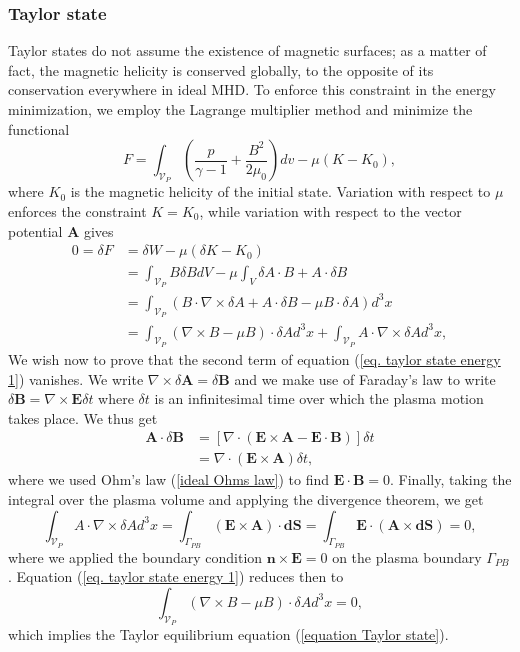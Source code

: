 \documentclass[my_thesis.tex]{subfiles}
\begin{document}
\subsubsection{Taylor state}
Taylor states do not assume the existence of magnetic surfaces; as a matter of fact, the magnetic helicity is conserved globally, to the opposite of its conservation everywhere in ideal MHD. To enforce this constraint in the energy minimization, we employ the Lagrange multiplier method and minimize the functional
\begin{equation}
	F = \int_{\mathcal{V}_P} \left(\frac{p}{\gamma-1}+\frac{B^2}{2\mu_0}\right)dv - \mu(K-K_0),
\end{equation}
where $K_0$ is the magnetic helicity of the initial state. Variation with respect to $\mu$ enforces the constraint $K=K_0$, while variation with respect to the vector potential $\mathbf{A}$ gives
\begin{align}
	0 = \delta F &= \delta W - \mu(\delta K - K_0)\\
	&= \int_{\mathcal{V}_P} B\delta B dV - \mu \int_V \delta A \cdot B + A \cdot \delta B\\
	&=\int_{\mathcal{V}_P} \left(B \cdot \nabla \times \delta A + A\cdot \delta B - \mu B \cdot \delta A\right) d^3x\\
	&=\int_{\mathcal{V}_P} \left( \nabla \times B - \mu B \right) \cdot \delta Ad^3x + \int_{\mathcal{V}_P}A \cdot \nabla \times \delta A d^3x, \label{eq. taylor state energy 1}
\end{align}
We wish now to prove that the second term of equation (\ref{eq. taylor state energy 1}) vanishes. We write $\nabla\times\delta\mathbf{A}=\delta\mathbf{B}$ and we make use of Faraday's law to write $\delta\mathbf{B} = \nabla\times\mathbf{E}\delta t$ where $\delta t$ is an infinitesimal time over which the plasma motion takes place. We thus get
\begin{align}
	\mathbf{A}\cdot\delta\mathbf{B}&=\left[\nabla\cdot(\mathbf{E}\times\mathbf{A}-\mathbf{E}\cdot\mathbf{B})\right]\delta t\\
	&= \nabla\cdot(\mathbf{E}\times\mathbf{A})\delta t,
\end{align}
where we used Ohm's law (\ref{ideal Ohms law}) to find $\mathbf{E}\cdot\mathbf{B}=0$. Finally, taking the integral over the plasma volume and applying the divergence theorem, we get
\begin{equation}
	\int_{\mathcal{V}_P}A \cdot \nabla \times \delta A d^3x = \int_{\Gamma_{PB}}  (\mathbf{E}\times\mathbf{A})\cdot\mathbf{dS} = \int_{\Gamma_{PB}}  \mathbf{E}\cdot(\mathbf{A}\times\mathbf{dS}) = 0,
\end{equation}
where we applied the boundary condition $\mathbf{n}\times\mathbf{E}=0$ on the plasma boundary $\Gamma_{PB}$. Equation (\ref{eq. taylor state energy 1}) reduces then to
\begin{equation}
	\int_{\mathcal{V}_P} \left( \nabla \times B - \mu B \right) \cdot \delta Ad^3x = 0,
\end{equation}
which implies the Taylor equilibrium equation (\ref{equation Taylor state}).
\end{document}
